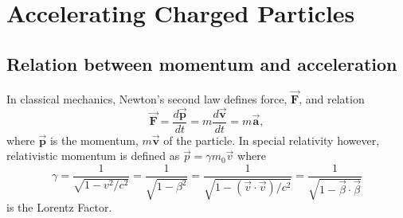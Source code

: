 \documentclass{article}
\begin{document}
\newcommand{\vecthreeBF}[1]{\vec{\textbf{#1}}}
\newcommand{\vecthree}[1]{\vec{#1}}

\newcommand{\parDeriv}[2]{\frac{\partial #1}{\partial #2}}
\newcommand{\deriv}[2]{\frac{d #1}{d #2}}

\newcommand{\dotProdBF}[2]{\vecthreeBF{#1} \cdot \vecthreeBF{#2}}
\newcommand{\dotProd}[2]{\vecthree{#1} \cdot \vecthree{#2}}

\newcommand{\crossProdBF}[2]{\vecthreeBF{#1} \times \vecthreeBF{#2}}
\newcommand{\crossProd}[2]{\vecthree{#1} \times \vecthree{#2}}


\newcommand{\fromeq}[1]{\textit{equation \ref{eq:#1}}}
\newcommand{\fromeqs}[2]{\textit{equations \ref{eq:#1} and \ref{eq:#2}}}


\section{Accelerating Charged Particles}

\subsection{Relation between momentum and acceleration}
In classical mechanics, Newton's second law defines force, $\vecthreeBF{F}$, and relation
\begin{equation} \label{eq:newton_second_law}
    \vecthreeBF{F} = \frac{d \vecthreeBF{p}}{d t} = m \frac{d \vecthreeBF{v}}{d t} = m \vecthreeBF{a} ,
\end{equation}
where $\vecthreeBF{p}$ is the momentum, $m\vecthreeBF{v}$ of the particle. 
In special relativity however, relativistic momentum is defined as $\vecthree{p} = \gamma m_0 \vecthree{v} $ where 
\begin{equation}
    \gamma = \frac{1}{\sqrt{1-v^2 / c^2}} = \frac{1}{\sqrt{1-\beta^2}}
            = \frac{1}{\sqrt{1- (\dotProd{v}{v})/ c^2}} =  \frac{1}{\sqrt{1- \dotProd{\beta}{\beta}}}
\end{equation}
is the Lorentz Factor.
\end{document}
